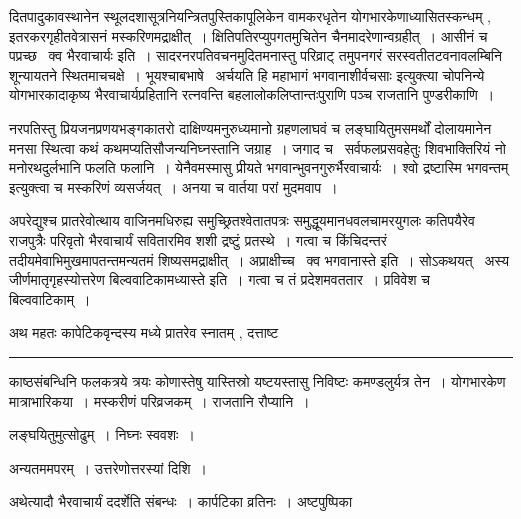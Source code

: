 \documentclass[11pt, openany]{book}
\begin{document}
\newpage

\noindent
दितपादुकावस्थानेन स्थूलदशासूत्रनियन्त्रितपुस्तिकापूलिकेन वामकरधृतेन योगभारकेणाध्यासितस्कन्धम् , इतरकरगृहीतवेत्रासनं मस्करिणमद्राक्षीत्~। क्षितिपतिरप्युपगतमुचितेन चैनमादरेणान्वग्रहीत्~। आसीनं च पप्रच्छ \textendash\ {\haq क्व भैरवाचार्यः} इति~। सादरनरपतिवचनमुदितमनास्तु परिव्राट् तमुपनगरं सरस्वतीतटवनावलम्बिनि शून्यायतने स्थितमाचचक्षे~। भूयश्चाबभाषे \textendash\ अर्चयति हि महाभागं भगवानाशीर्वचसाः इत्युक्त्या चोपनिन्ये योगभारकादाकृष्य भैरवाचार्यप्रहितानि रत्नवन्ति बहलालोकलिप्तान्तःपुराणि पञ्च राजतानि पुण्डरीकाणि~। 

नरपतिस्तु प्रियजनप्रणयभङ्गकातरो दाक्षिण्यमनुरुध्यमानो ग्रहणलाघवं च लङ्घायितुमसमर्थों दोलायमानेन मनसा स्थित्वा कथं कथमप्यतिसौजन्यनिघ्नस्तानि जग्राह~। जगाद च \textendash\ {\haq सर्वफलप्रसवहेतुः शिवभाक्तिरियं नो मनोरथदुर्लभानि फलति फलानि~। येनैवमस्मासु प्रीयते भगवान्भुवनगुरुर्भैरवाचार्यः~। श्वो द्रष्टास्मि भगवन्तम्} इत्युक्त्वा च मस्करिणं व्यसर्जयत्~। अनया च वार्तया परां मुदमवाप~। 

अपरेद्युश्च प्रातरेवोत्थाय वाजिनमधिरुह्य समुच्छ्रितश्वेतातपत्रः समुद्धूयमानधवलचामरयुगलः कतिपयैरेव राजपुत्रैः परिवृतो भैरवाचार्यं सवितारमिव शशी द्रष्टुं प्रतस्थे~। गत्वा च किंचिदन्तरं तदीयमेवाभिमुखमापतन्तमन्यतमं शिष्यसमद्राक्षीत्~। अप्राक्षीच्च \textendash\ {\haq क्व भगवानास्ते} इति~। सोऽकथयत् \textendash\ {\haq अस्य जीर्णमातृगृहस्योत्तरेण बिल्ववाटिकामध्यास्ते} इति~। गत्वा च तं प्रदेशमवततार~। प्रविवेश च बिल्ववाटिकाम्~। 

अथ महतः कापेटिकवृन्दस्य मध्ये प्रातरेव स्नातम् , दत्ताष्ट\textendash

\vspace{2mm}
\hrule

\noindent
{\s काष्ठसंबन्धिनि फलकत्रये त्रयः कोणास्तेषु यास्तिस्रो यष्टयस्तासु निविष्टः कमण्डलुर्यत्र तेन~। योगभारकेण मात्राभारिकया~। मस्करीणं परिव्रजकम्~। राजतानि रौप्यानि~।

लङ्घयितुमुत्सोढुम्~। निघ्नः स्ववशः~।

अन्यतममपरम्~। उत्तरेणोत्तरस्यां दिशि~।

अथेत्यादौ भैरवाचार्यं ददर्शेति संबन्धः~। कार्पटिका व्रतिनः~। अष्टपुष्पिका}

\newpage
\end{document}
